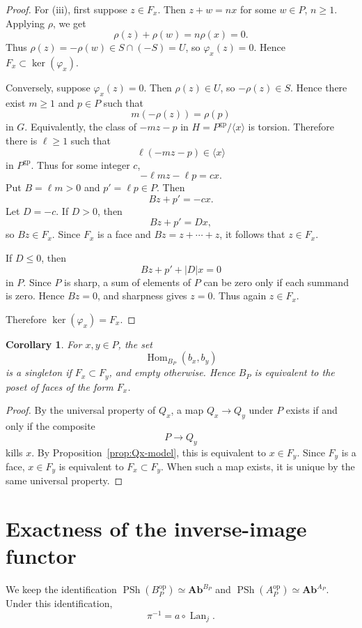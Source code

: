 \documentclass[12pt]{article}
\newtheorem{corollary}[theorem]{Corollary}
\theoremstyle{definition}
\theoremstyle{remark}
\numberwithin{equation}{section}
\newcommand{\gp}{\mathrm{gp}}
\newcommand{\op}{\mathrm{op}}
\newcommand{\Ab}{\mathbf{Ab}}
\newcommand{\PSh}{\operatorname{PSh}}
\newcommand{\Lan}{\operatorname{Lan}}
\begin{document}
\begin{proof}
For (iii), first suppose \(z\in F_x\).  Then \(z+w=nx\) for some \(w\in P\), \(n\geq 1\).  Applying \(\rho\), we get
\[
\rho(z)+\rho(w)=n\rho(x)=0.
\]
Thus \(\rho(z)=-\rho(w)\in S\cap(-S)=U\), so \(\varphi_x(z)=0\).  Hence \(F_x\subset \ker(\varphi_x)\).

Conversely, suppose \(\varphi_x(z)=0\).  Then \(\rho(z)\in U\), so \(-\rho(z)\in S\).  Hence there exist \(m\geq 1\) and \(p\in P\) such that
\[
m(-\rho(z))=\rho(p)
\]
in \(G\).  Equivalently, the class of \(-mz-p\) in \(H=P^{\gp}/\langle x\rangle\) is torsion.  Therefore there is \(\ell\geq 1\) such that
\[
\ell(-mz-p)\in \langle x\rangle
\]
in \(P^{\gp}\).  Thus for some integer \(c\),
\[
-\ell m z-\ell p = cx.
\]
Put \(B=\ell m>0\) and \(p'=\ell p\in P\).  Then
\[
Bz+p'=-cx.
\]
Let \(D=-c\).  If \(D>0\), then
\[
Bz+p'=Dx,
\]
so \(Bz\in F_x\).  Since \(F_x\) is a face and \(Bz=z+\cdots+z\), it follows that \(z\in F_x\).

If \(D\leq 0\), then
\[
Bz+p'+|D|x=0
\]
in \(P\).  Since \(P\) is sharp, a sum of elements of \(P\) can be zero only if each summand is zero.  Hence \(Bz=0\), and sharpness gives \(z=0\).  Thus again \(z\in F_x\).

Therefore \(\ker(\varphi_x)=F_x\).
\end{proof}

\begin{corollary}\label{cor:B-face-poset}
For \(x,y\in P\), the set
\[
\operatorname{Hom}_{B_P}(b_x,b_y)
\]
is a singleton if \(F_x\subset F_y\), and empty otherwise.  Hence \(B_P\) is equivalent to the poset of faces of the form \(F_x\).
\end{corollary}

\begin{proof}
By the universal property of \(Q_x\), a map \(Q_x\to Q_y\) under \(P\) exists if and only if the composite
\[
P\longrightarrow Q_y
\]
kills \(x\).  By Proposition~\ref{prop:Qx-model}, this is equivalent to \(x\in F_y\).  Since \(F_y\) is a face, \(x\in F_y\) is equivalent to \(F_x\subset F_y\).  When such a map exists, it is unique by the same universal property.
\end{proof}

\section{Exactness of the inverse-image functor}

We keep the identification \(\PSh(B_P^{\op})\simeq \Ab^{B_P}\) and \(\PSh(A_P^{\op})\simeq \Ab^{A_P}\).  Under this identification,
\[
\pi^{-1}=a\circ \Lan_j.
\]
\end{document}

